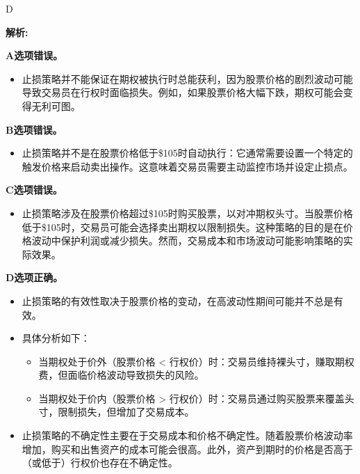 \documentclass{article}
\newenvironment{explanation}
{\textbf{解析:}\par}
{\par}
\begin{document}
                \begin{correctanswer}
                D
                \end{correctanswer}
                
                \begin{explanation}
                        \textbf{A选项错误。}
                \begin{itemize}
                \item 止损策略并不能保证在期权被执行时总能获利，因为股票价格的剧烈波动可能导致交易员在行权时面临损失。例如，如果股票价格大幅下跌，期权可能会变得无利可图。
                \end{itemize}

                \textbf{B选项错误。}
                \begin{itemize}
                \item 止损策略并不是在股票价格低于\$105时自动执行：它通常需要设置一个特定的触发价格来启动卖出操作。这意味着交易员需要主动监控市场并设定止损点。
                \end{itemize}

                \textbf{C选项错误。}
                \begin{itemize}
                    \item 止损策略涉及在股票价格超过\$105时购买股票，以对冲期权头寸。当股票价格低于\$105时，交易员可能会选择卖出期权以限制损失。这种策略的目的是在价格波动中保护利润或减少损失。然而，交易成本和市场波动可能影响策略的实际效果。
                \end{itemize}
                    
                    \textbf{D选项正确。}
                    \begin{itemize}
                        \item 止损策略的有效性取决于股票价格的变动，在高波动性期间可能并不总是有效。
                        \item 具体分析如下：
                        \begin{itemize}
                            \item 当期权处于价外（股票价格 < 行权价）时：交易员维持裸头寸，赚取期权费，但面临价格波动导致损失的风险。
                            \item 当期权处于价内（股票价格 > 行权价）时：交易员通过购买股票来覆盖头寸，限制损失，但增加了交易成本。
                        \end{itemize}
                        \item 止损策略的不确定性主要在于交易成本和价格不确定性。随着股票价格波动率增加，购买和出售资产的成本可能会很高。此外，资产到期时的价格是否高于（或低于）行权价也存在不确定性。
                    \end{itemize}
                    \end{explanation}
\end{document}
